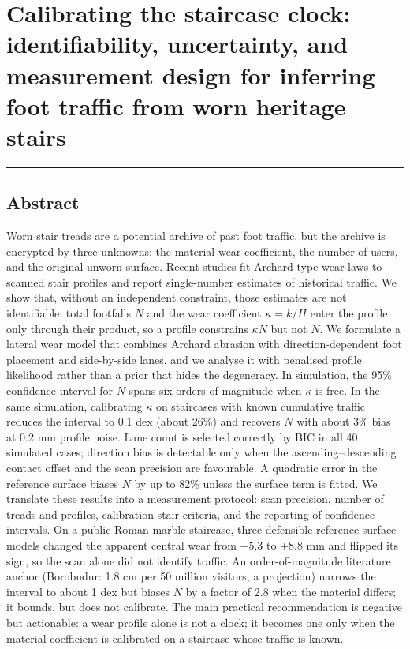 \documentclass[
]{article}
\author{}
\date{}
\begin{document}
\section{Calibrating the staircase clock: identifiability, uncertainty,
and measurement design for inferring foot traffic from worn heritage
stairs}\label{calibrating-the-staircase-clock-identifiability-uncertainty-and-measurement-design-for-inferring-foot-traffic-from-worn-heritage-stairs}

\begin{center}\rule{0.5\linewidth}{0.5pt}\end{center}

\subsection{Abstract}\label{abstract}

Worn stair treads are a potential archive of past foot traffic, but the
archive is encrypted by three unknowns: the material wear coefficient,
the number of users, and the original unworn surface. Recent studies fit
Archard-type wear laws to scanned stair profiles and report
single-number estimates of historical traffic. We show that, without an
independent constraint, those estimates are not identifiable: total
footfalls \(N\) and the wear coefficient \(\kappa=k/H\) enter the
profile only through their product, so a profile constrains \(\kappa N\)
but not \(N\). We formulate a lateral wear model that combines Archard
abrasion with direction-dependent foot placement and side-by-side lanes,
and we analyse it with penalised profile likelihood rather than a prior
that hides the degeneracy. In simulation, the 95\% confidence interval
for \(N\) spans six orders of magnitude when \(\kappa\) is free. In the
same simulation, calibrating \(\kappa\) on staircases with known
cumulative traffic reduces the interval to 0.1 dex (about 26\%) and
recovers \(N\) with about 3\% bias at 0.2 mm profile noise. Lane count
is selected correctly by BIC in all 40 simulated cases; direction bias
is detectable only when the ascending--descending contact offset and the
scan precision are favourable. A quadratic error in the reference
surface biases \(N\) by up to 82\% unless the surface term is fitted. We
translate these results into a measurement protocol: scan precision,
number of treads and profiles, calibration-stair criteria, and the
reporting of confidence intervals. On a public Roman marble staircase,
three defensible reference-surface models changed the apparent central
wear from \(-5.3\) to +8.8 mm and flipped its sign, so the scan alone
did not identify traffic. An order-of-magnitude literature anchor
(Borobudur: 1.8 cm per 50 million visitors, a projection) narrows the
interval to about 1 dex but biases \(N\) by a factor of 2.8 when the
material differs; it bounds, but does not calibrate. The main practical
recommendation is negative but actionable: a wear profile alone is not a
clock; it becomes one only when the material coefficient is calibrated
on a staircase whose traffic is known.
\end{document}
